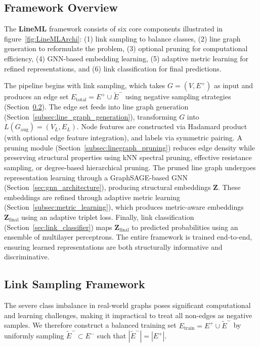 \documentclass[pdflatex,sn-mathphys-num]{sn-jnl}%
\theoremstyle{thmstyleone}%
\theoremstyle{thmstyletwo}%
\theoremstyle{thmstylethree}%
\theoremstyle{plain} %
\theoremstyle{definition} %
\theoremstyle{remark} %
\theoremstyle{plain} %
\begin{document}
\subsection{Framework Overview}
\label{sec:framework_overview}


The \textbf{LineML} framework consists of six core components illustrated in figure~\ref{fig:LineMLArchi}: 
(1) link sampling to balance classes, 
(2) line graph generation to reformulate the problem, 
(3) optional pruning for computational efficiency, 
(4) GNN-based embedding learning, 
(5) adaptive metric learning for refined representations, and 
(6) link classification for final predictions.

The pipeline begins with link sampling, which takes $G = (V, E^+)$ as input and produces an edge set $E_{\text{total}} = E^+ \cup \tilde{E}^-$ using negative sampling strategies (Section~\ref{subsec:link_sampling}). 
The edge set feeds into line graph generation (Section~\ref{subsec:line_graph_generation}), transforming $G$ into $L(G_{\text{aug}}) = (V_L, E_L)$. 
Node features are constructed via Hadamard product (with optional edge feature integration), and labels via symmetric pairing.
A pruning module (Section~\ref{subsec:linegraph_pruning}) reduces edge density while preserving structural properties using kNN spectral pruning, effective resistance sampling, or degree-based hierarchical pruning.
The pruned line graph undergoes representation learning through a GraphSAGE-based GNN (Section~\ref{sec:gnn_architecture}), producing structural embeddings $\mathbf{Z}$.
These embeddings are refined through adaptive metric learning (Section~\ref{subsec:metric_learning}), which produces metric-aware embeddings $\mathbf{Z}_{\text{final}}$ using an adaptive triplet loss.
Finally, link classification (Section~\ref{sec:link_classifier}) maps $\mathbf{Z}_{\text{final}}$ to predicted probabilities using an ensemble of multilayer perceptrons.
The entire framework is trained end-to-end, ensuring learned representations are both structurally informative and discriminative.

\subsection{Link Sampling Framework}
\label{subsec:link_sampling}
The severe class imbalance in real-world graphs poses significant computational and learning challenges, making it impractical to treat all non-edges as negative samples. We therefore construct a balanced training set $E_{\text{train}} = E^+ \cup \tilde{E}^-$ by uniformly sampling $\tilde{E}^- \subset E^-$ such that $|\tilde{E}^-| = |E^+|$.
\end{document}
